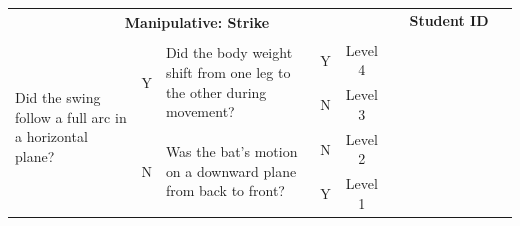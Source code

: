 \documentclass[
  letterpaper,
  DIV=11,
  numbers=noendperiod]{scrartcl}
\begin{document}
\begin{tabular}{|p{5.5cm}|c|p{5.5cm}|c|c|*{9}{p{1.07cm}|}}
\hline
\multicolumn{5}{|c|}{\multirow{2}{*}{\centering \textbf{Manipulative: Strike}}} & \multicolumn{9}{c|}{\textbf{Student ID}} \\ 
\cline{6-14}
\multicolumn{5}{|c|}{} & & & & & & & & & \\
\hline
\multirow{4}{5.5cm}{\raggedright {\footnotesize Did the swing follow a full arc in a horizontal plane?}} 
& \multirow{2}{*}{\footnotesize Y} 
& \multirow{2}{5.5cm}{\raggedright {\footnotesize Did the body weight shift from one leg to the other during movement?}} & {\footnotesize Y} & {\footnotesize Level 4} & & & & & & & & & \\
\cline{4-14}
& & & {\footnotesize N} & {\footnotesize Level 3} & & & & & & & & & \\
\cline{2-14}
& \multirow{2}{*}{\footnotesize N} & \multirow{2}{5.5cm}{\raggedright {\footnotesize Was the bat's motion on a downward plane from back to front?}} & {\footnotesize N} & {\footnotesize Level 2} & & & & & & & & & \\
\cline{4-14}
& & & {\footnotesize Y} & {\footnotesize Level 1} & & & & & & & & & \\
\hline
\end{tabular}

\vspace{.5em}
\end{document}
